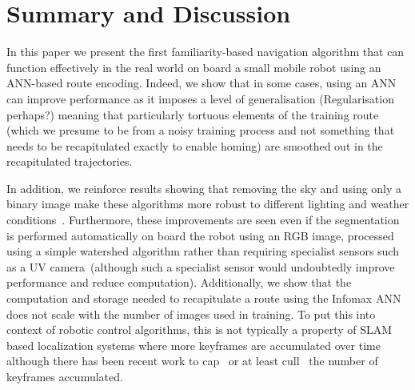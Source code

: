 \documentclass[letterpaper]{article}
\begin{document}
\section{Summary and Discussion}
In this paper we present the first familiarity-based navigation algorithm that can function effectively in the real world on board a small mobile robot using an ANN-based route encoding. 
Indeed, we show that in some cases, using an ANN can improve performance as it imposes a level of generalisation (Regularisation perhaps?) meaning that particularly tortuous elements of the training route (which we presume to be from a noisy training process and not something that needs to be recapitulated exactly to enable homing) are smoothed out in the recapitulated trajectories.

In addition, we reinforce results showing that removing the sky and using only a binary image make these algorithms more robust to different lighting and weather conditions~\citep{Philippides2011,Stone2014}. 
Furthermore, these improvements are seen even if the segmentation is performed automatically on board the robot using an RGB image, processed using a simple watershed algorithm rather than requiring specialist sensors such as a UV camera~(although such a specialist sensor would undoubtedly improve performance and reduce computation).
Additionally, we show that the computation and storage needed to recapitulate a route using the Infomax ANN does not scale with the number of images used in training.
To put this into context of robotic control algorithms, this is not typically a property of SLAM based localization systems where more keyframes are accumulated over time although there has been recent work to cap~\citep{Maddern2012} or at least cull~\citep{Mur-Artal2015} the number of keyframes accumulated.
\end{document}
